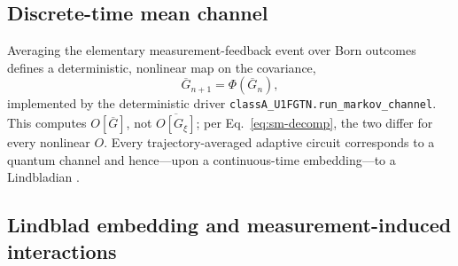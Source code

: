 \documentclass[aps,prl,onecolumn,superscriptaddress,nofootinbib]{revtex4-2}
\newcommand{\avg}[1]{\overline{#1}}
\newcommand{\Gtraj}{G_{\xi}}
\newcommand{\Gbar}{\overline{G}}
\begin{document}
\subsection{Discrete-time mean channel}

Averaging the elementary measurement-feedback event over Born outcomes defines a deterministic, nonlinear map on the covariance,
\begin{equation}
  \Gbar_{n+1}=\Phi(\Gbar_n),
  \label{eq:sm-channel}
\end{equation}
implemented by the deterministic driver \texttt{classA\_U1FGTN.run\_markov\_channel}.  This computes $O[\Gbar]$, not $\avg{O[\Gtraj]}$; per Eq.~\eqref{eq:sm-decomp}, the two differ for every nonlinear $O$.  Every trajectory-averaged adaptive circuit corresponds to a quantum channel and hence---upon a continuous-time embedding---to a Lindbladian \cite{BhuiyanPanJian2026,Guo2025}.

\subsection{Lindblad embedding and measurement-induced interactions}
\end{document}
